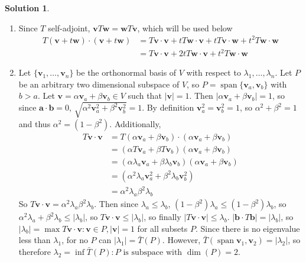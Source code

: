 \documentclass[11pt]{article}
\theoremstyle{definition}
\newtheorem*{solution}{Solution}
\DeclareMathOperator{\spn}{span}
\newcommand{\va}{\mathbf{a}}
\newcommand{\vb}{\mathbf{b}}
\newcommand{\vv}{\mathbf{v}}
\newcommand{\vw}{\mathbf{w}}
\begin{document}
    \begin{solution}
        \begin{enumerate}[label = \alph*)]
            \item Since $T$ self-adjoint, $\vv T \vw = \vw T \vv$, which will be used below
            \begin{align*}
                T(\vv + t \vw) \cdot (\vv + t \vw) &= T\vv \cdot \vv +  tT\vw \cdot \vv + tT\vv \cdot \vw + t^2 T\vw \cdot \vw\\
                &= T\vv \cdot \vv + 2tT\vw \cdot \vv + t^2 T\vw \cdot \vw
            \end{align*}
            \item Let $\{\vv_1, \dots, \vv_n\}$ be the orthonormal basis of $V$ with respect to $\lambda_1, \dots, \lambda_n$. Let $P$ be an arbitrary two dimensional subspace of $V$, so $P = \spn \{\vv_a, \vv_b\}$ with $b > a$. Let $\vv = \alpha \vv_a + \beta \vv_b \in V$ such that $|\vv| = 1$. Then $|\alpha \vv_a + \beta \vv_b| = 1$, so since $\va \cdot \vb = 0$, $\sqrt{\alpha^2 \vv_a^2 + \beta^2 \vv_b^2} = 1$. By definition $\vv_a^2 = \vv_b^2 = 1$, so $\alpha^2 + \beta^2 = 1$ and thus $\alpha^2 = (1 - \beta^2)$. Additionally, 
            \begin{align*}
                T\vv \cdot \vv &= T(\alpha \vv_a + \beta \vv_b)\cdot (\alpha \vv_a + \beta \vv_b)\\
                &= (\alpha T\vv_a + \beta T\vv_b)(\alpha \vv_a + \beta \vv_b)\\
                &= (\alpha \lambda_a\vv_a + \beta \lambda_b\vv_b)(\alpha \vv_a + \beta \vv_b)\\
                &= (\alpha^2\lambda_a\vv_a^2 + \beta^2 \lambda_b \vv_b^2)\\
                &= \alpha^2 \lambda_a \beta^2\lambda_b
            \end{align*}
            So $T\vv \cdot \vv = \alpha^2 \lambda_a \beta^2\lambda_b$. Then since $\lambda_a \le \lambda_b$, $(1-\beta^2)\lambda_a \le (1-\beta^2)\lambda_b$, so $\alpha^2 \lambda_a + \beta^2 \lambda_b \le |\lambda_b|$, so $T\vv \cdot \vv \le |\lambda_b|$, so finally $|T\vv \cdot \vv| \le \lambda_b$. $|\vb \cdot T\vb| = |\lambda_b|$, so $|\lambda_b| =  \max{T\vv \cdot \vv : \vv \in P, |\vv| = 1}$ for all subsets $P$. Since there is no eigenvalue less than $\lambda_1$, for no $P$ can $|\lambda_1| = \bar{T}(P)$. However, $\bar{T}(\spn{\vv_1, \vv_2}) = |\lambda_2|$, so therefore $\lambda_2 = \inf{\bar T(P) : P \text{ is subspace with }\dim(P) = 2}$.
        \end{enumerate}
    \end{solution}
\end{document}
